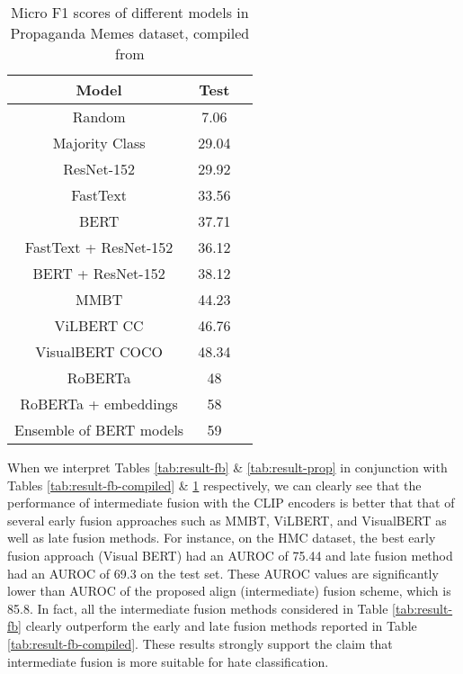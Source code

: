 \documentclass[11pt]{article}
\begin{document}
\begin{table}[!h]
\centering
\begin{tabular}{|c|c|c|}
\hline
  \textbf{Model} &
  \textbf{Test} \\
\hline
Random                                     & 7.06          \\
Majority Class                                & 29.04          \\
ResNet-152                              & 29.92         \\
FastText                                  & 33.56           \\
BERT                                & 37.71           \\
FastText + ResNet-152                                & 36.12          \\
BERT + ResNet-152                                  & 38.12         \\
MMBT & 44.23 \\
ViLBERT CC & 46.76 \\
VisualBERT COCO & 48.34 \\
RoBERTa & 48 \\
RoBERTa + embeddings & 58 \\
Ensemble of BERT models & 59 \\
\hline
\end{tabular}
\caption{Micro F1 scores of different models in Propaganda Memes dataset, compiled from \citet{sharma2022detecting, dimitrov2021detecting}}
\label{tab:result-prop-compiled}
\end{table}

When we interpret Tables \ref{tab:result-fb} \& \ref{tab:result-prop} in conjunction with Tables \ref{tab:result-fb-compiled} \& \ref{tab:result-prop-compiled} respectively, we can clearly see that the performance of intermediate fusion with the CLIP encoders is better that that of several early fusion approaches such as MMBT, ViLBERT, and VisualBERT as well as late fusion methods. For instance, on the HMC dataset, the best early fusion approach (Visual BERT) had an AUROC of 75.44 and late fusion method had an AUROC of 69.3 on the test set. These AUROC values are significantly lower than AUROC of the proposed align (intermediate) fusion scheme, which is 85.8. In fact, all the intermediate fusion methods considered in Table \ref{tab:result-fb} clearly outperform the early and late fusion methods reported in Table \ref{tab:result-fb-compiled}. These results strongly support the claim that intermediate fusion is more suitable for hate classification. 
\end{document}
